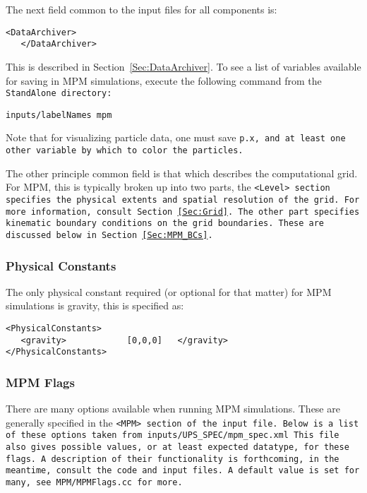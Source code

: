 The next field common to the input files for all components is:

\begin{Verbatim}[fontsize=\footnotesize]
   <DataArchiver>
   </DataArchiver>
\end{Verbatim}
This is described in Section~\ref{Sec:DataArchiver}.  To see a list of
variables available for saving in MPM simulations, execute the following
command from the \tt StandAlone \normalfont directory:

\begin{Verbatim}[fontsize=\footnotesize]
inputs/labelNames mpm
\end{Verbatim}
Note that for visualizing particle data, one must save \tt p.x, \normalfont
and at least one other variable by which to color the particles.

The other principle common field is that which describes the computational
grid.  For MPM, this is typically broken up into two parts, the
\tt <Level> \normalfont section specifies the physical extents and spatial
resolution of the grid.  For more information, consult Section~\ref{Sec:Grid}.
The other part specifies kinematic boundary conditions on the grid boundaries.
These are discussed below in Section~\ref{Sec:MPM_BCs}.

\subsubsection{Physical Constants} \label{Sec:physicalConstants}
The only physical constant required (or optional for that matter) for
MPM simulations is gravity, this is specified as:

\begin{Verbatim}[fontsize=\footnotesize]
<PhysicalConstants>
   <gravity>            [0,0,0]   </gravity>
</PhysicalConstants>
\end{Verbatim}

\subsubsection{MPM Flags} \label{Sec:MPMFlags}

There are many options available when running MPM simulations.  These
are generally specified in the \tt <MPM> \normalfont section of the input file.
Below is a list of these options taken from
\tt inputs/UPS\_SPEC/mpm\_spec.xml \normalfont 
This file also gives possible values, or at least expected datatype,
for these flags.  A description of their functionality is forthcoming,
in the meantime, consult the code and input files.  A default value is
set for many, see \tt MPM/MPMFlags.cc \normalfont for more.

